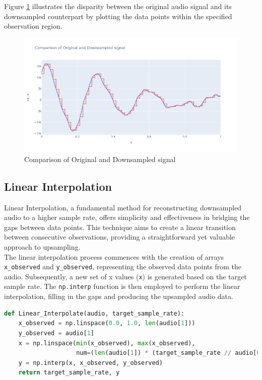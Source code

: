 \documentclass{article}
\begin{document}
Figure \ref{fig:orig_vs_downsampled} illustrates the disparity between the original audio signal and its downsampled counterpart by plotting the data points within the specified observation region. \\


\begin{figure}[h]
    \centering
    \includegraphics[width=\textwidth]{OrigVsDownSampled.png}
    \caption{Comparison of Original and Downsampled signal}
    \label{fig:orig_vs_downsampled}
\end{figure}

\newpage
\subsection{Linear Interpolation}

Linear Interpolation, a fundamental method for reconstructing downsampled audio to a higher sample rate, offers simplicity and effectiveness in bridging the gaps between data points. This technique aims to create a linear transition between consecutive observations, providing a straightforward yet valuable approach to upsampling.\\

The linear interpolation process commences with the creation of arrays \texttt{x\_observed} and \texttt{y\_observed}, representing the observed data points from the audio. Subsequently, a new set of x values (\texttt{x}) is generated based on the target sample rate. The \texttt{np.interp} function is then employed to perform the linear interpolation, filling in the gaps and producing the upsampled audio data.



\begin{lstlisting}[language=Python, caption={Linear Interpolation Function}]
def Linear_Interpolate(audio, target_sample_rate):
    x_observed = np.linspace(0.0, 1.0, len(audio[1]))
    y_observed = audio[1]
    x = np.linspace(min(x_observed), max(x_observed),
                    num=(len(audio[1]) * (target_sample_rate // audio[0])))
    y = np.interp(x, x_observed, y_observed)
    return target_sample_rate, y
\end{lstlisting} 
 
\end{document}
